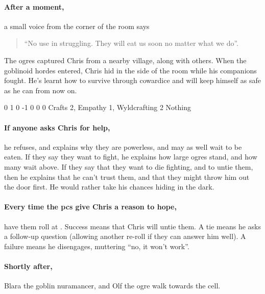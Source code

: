 \begin{multicols}{2}
\paragraph{After a moment,}
a small voice from the corner of the room says

\begin{quotation}
  \noindent
  ``No use in struggling.
  They will eat us soon no matter what we do''.
\end{quotation}

The ogres captured Chris from a nearby village, along with others.
When the goblinoid hordes entered, Chris hid in the side of the room while his companions fought.
He's learnt how to survive through cowardice and will keep himself as safe as he can from now on.

{0}%
{1}%
{{0}%
{-1}%
{0}}%
{0}%
{0}%
{
  \setcounter{Projectiles}{2}
  Crafts 2, Empathy 1, Wyldcrafting 2
}%
{Nothing}%
{}

\paragraph{If anyone asks Chris for help,}
he refuses, and explains why they are powerless, and may as well wait to be eaten.
If they say they want to fight, he explains how large ogres stand, and how many wait above.
If they say that they want to die fighting, and to untie them, then he explains that he can't trust them, and that they might throw him out the door first.
He would rather take his chances hiding in the dark.

\paragraph{Every time the \glspl{pc} give Chris a reason to hope,}
have them roll  at \iftoggle{oneshot}{\tn[9]}{\tn[11]}.
Success means that Chris will untie them.
A tie means he asks a follow-up question (allowing another re-roll if they can answer him well).
A failure means he disengages, muttering ``no, it won't work''.

\paragraph{Shortly after,}
Blara the goblin nuramancer, and Olf the ogre walk towards the cell.


\end{multicols}
